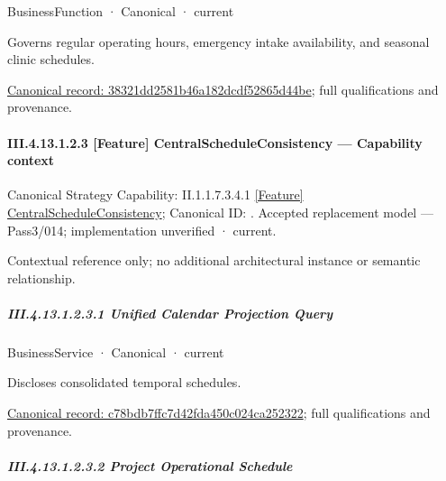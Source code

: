 \label{element:38321dd2581b46a182dcdf52865d44be}
{\small BusinessFunction · Canonical · current}\par

Governs regular operating hours, emergency intake availability, and seasonal clinic schedules.


{\footnotesize \href{../../../../../../../../continuum/business/business-function/38321dd2581b46a182dcdf52865d44be.md}{Canonical record: 38321dd2581b46a182dcdf52865d44be}; full qualifications and provenance.}\par
\paragraph*{III.4.13.1.2.3 [Feature] CentralScheduleConsistency — Capability context}
\label{navigation:III.4.13.1.2.3}

{\small Canonical Strategy Capability: II.1.1.7.3.4.1 \hyperref[element:5a39c3923f0e4e079acf913126754075]{[Feature] CentralScheduleConsistency}; Canonical ID: \texttt{}. Accepted replacement model — Pass3/014; implementation unverified · current.}\par
Contextual reference only; no additional architectural instance or semantic relationship.\par
\subparagraph*{III.4.13.1.2.3.1 Unified Calendar Projection Query}
\label{navigation:III.4.13.1.2.3.1}

\label{element:c78bdb7ffc7d42fda450c024ca252322}
{\small BusinessService · Canonical · current}\par

Discloses consolidated temporal schedules.


{\footnotesize \href{../../../../../../../../continuum/business/business-service/c78bdb7ffc7d42fda450c024ca252322.md}{Canonical record: c78bdb7ffc7d42fda450c024ca252322}; full qualifications and provenance.}\par
\subparagraph*{III.4.13.1.2.3.2 Project Operational Schedule}
\label{navigation:III.4.13.1.2.3.2}

